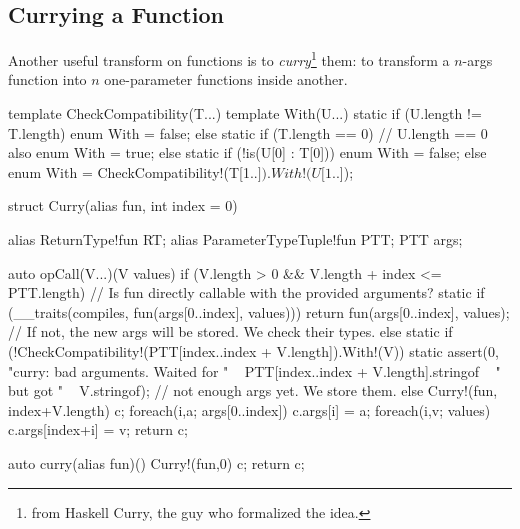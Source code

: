 \subsection{Currying a Function} \label{currying}


Another useful transform on functions is to \emph{curry}\footnote{from Haskell Curry, the guy who formalized the idea.} them: to transform a $n$-args function into $n$ one-parameter functions inside another.


\begin{dcode}
template CheckCompatibility(T...)
{
    template With(U...)
    {
        static if (U.length != T.length)
            enum With = false;
        else static if  (T.length == 0) // U.length == 0 also
            enum With = true;
        else static if (!is(U[0] : T[0]))
            enum With = false;
        else
            enum With = CheckCompatibility!(T[1..$]).With!(U[1..$]);
    }
}
\end{dcode}

\begin{dcode}
struct Curry(alias fun, int index = 0)
{
    alias ReturnType!fun RT;
    alias ParameterTypeTuple!fun PTT;
    PTT args;

    auto opCall(V...)(V values)
        if (V.length > 0
         && V.length + index <= PTT.length)
    {
        // Is fun directly callable with the provided arguments?
        static if (__traits(compiles, fun(args[0..index], values)))
            return fun(args[0..index], values);
        // If not, the new args will be stored. We check their types.
        else static if (!CheckCompatibility!(PTT[index..index + V.length]).With!(V))
            static assert(0, "curry: bad arguments. Waited for "
                            ~ PTT[index..index + V.length].stringof
                            ~ " but got " ~ V.stringof);
        // not enough args yet. We store them.
        else
        {
            Curry!(fun, index+V.length) c;
            foreach(i,a; args[0..index]) c.args[i] = a;
            foreach(i,v; values) c.args[index+i] = v;
            return c;
        }
    }
}

auto curry(alias fun)()
{
    Curry!(fun,0) c;
    return c;
}
\end{dcode}

